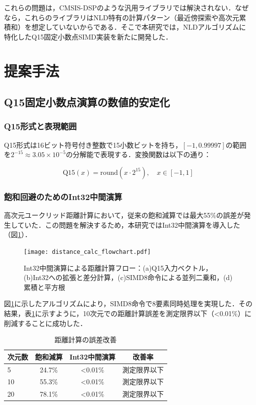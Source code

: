 \documentclass[paper]{ieice}
\begin{document}
これらの問題は，CMSIS-DSP\cite{arm2020}のような汎用ライブラリでは解決されない．なぜなら，これらのライブラリはNLD特有の計算パターン（最近傍探索や高次元累積和）を想定していないからである．そこで本研究では，NLDアルゴリズムに特化したQ15固定小数点SIMD実装を新たに開発した．

\section{提案手法}

\subsection{Q15固定小数点演算の数値的安定化}

\subsubsection{Q15形式と表現範囲}
Q15形式は16ビット符号付き整数で15小数ビットを持ち，$[-1, 0.99997]$の範囲を$2^{-15} \approx 3.05 \times 10^{-5}$の分解能で表現する．変換関数は以下の通り：

\begin{equation}
\text{Q15}(x) = \text{round}(x \cdot 2^{15}), \quad x \in [-1, 1]
\end{equation}

\subsubsection{飽和回避のためのInt32中間演算}
高次元ユークリッド距離計算において，従来の飽和減算では最大55\%の誤差が発生していた．この問題を解決するため，本研究ではInt32中間演算を導入した（図\ref{fig:flowchart}）．

\begin{figure}[t]
\centering
\texttt{[image: distance\_calc\_flowchart.pdf]}
\caption{Int32中間演算による距離計算フロー：(a)Q15入力ベクトル，(b)Int32への拡張と差分計算，(c)SIMD8命令による並列二乗和，(d)累積と平方根}
\label{fig:flowchart}
\end{figure}

図\ref{fig:flowchart}に示したアルゴリズムにより，SIMD8命令で8要素同時処理を実現した．その結果，表\ref{tab:distance_error}に示すように，10次元での距離計算誤差を測定限界以下（<0.01\%）に削減することに成功した．

\begin{table}[t]
\caption{距離計算の誤差改善}
\label{tab:distance_error}
\centering
\begin{tabular}{lccc}
\toprule
次元数 & 飽和減算 & Int32中間演算 & 改善率 \\
\midrule
5 & 24.7\% & <0.01\% & 測定限界以下 \\
10 & 55.3\% & <0.01\% & 測定限界以下 \\
20 & 78.1\% & <0.01\% & 測定限界以下 \\
\bottomrule
\end{tabular}
\end{table}
\end{document}
